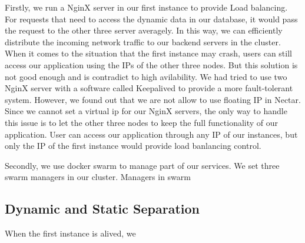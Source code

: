 \documentclass{article}
\begin{document}
Firstly, we run a NginX server in our first instance to provide Load balancing. For requests that need to access the dynamic data in our database, it would pass the request to the other three server averagely. In this way, we can efficiently distribute the incoming network traffic to our backend servers in the cluster. When it comes to the situation that the first instance may crash, users can still access our application using the IPs of the other three nodes. But this solution is not good enough and is contradict to high avilability. We had tried to use two NginX server with a software called Keepalived to provide a more fault-tolerant system. However, we found out that we are not allow to use floating IP in Nectar. Since we cannot set a virtual ip for our NginX servers, the only way to handle this issue is to let the other three nodes to keep the full functionality of our application. User can access our application through any IP of our instances, but only the IP of the first instance would provide load banlancing control. 

Secondly, we use docker swarm to manage part of our services. We set three swarm managers in our cluster. Managers in swarm 


\subsection{Dynamic and Static Separation}
When the first instance is alived, we 






\end{document}
